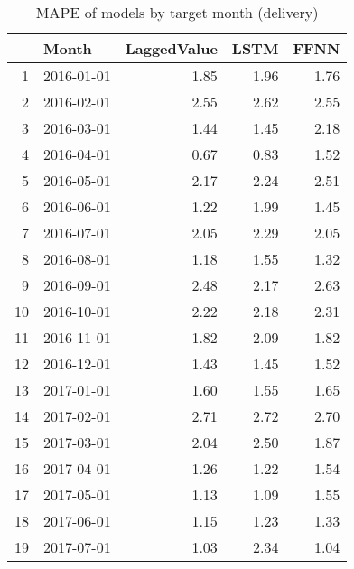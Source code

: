 \begin{table}[ht]
\centering
\begin{tabular}{rlrrr}
  \hline
 & Month & LaggedValue & LSTM & FFNN \\ 
  \hline
1 & 2016-01-01 & 1.85 & 1.96 & 1.76 \\ 
  2 & 2016-02-01 & 2.55 & 2.62 & 2.55 \\ 
  3 & 2016-03-01 & 1.44 & 1.45 & 2.18 \\ 
  4 & 2016-04-01 & 0.67 & 0.83 & 1.52 \\ 
  5 & 2016-05-01 & 2.17 & 2.24 & 2.51 \\ 
  6 & 2016-06-01 & 1.22 & 1.99 & 1.45 \\ 
  7 & 2016-07-01 & 2.05 & 2.29 & 2.05 \\ 
  8 & 2016-08-01 & 1.18 & 1.55 & 1.32 \\ 
  9 & 2016-09-01 & 2.48 & 2.17 & 2.63 \\ 
  10 & 2016-10-01 & 2.22 & 2.18 & 2.31 \\ 
  11 & 2016-11-01 & 1.82 & 2.09 & 1.82 \\ 
  12 & 2016-12-01 & 1.43 & 1.45 & 1.52 \\ 
  13 & 2017-01-01 & 1.60 & 1.55 & 1.65 \\ 
  14 & 2017-02-01 & 2.71 & 2.72 & 2.70 \\ 
  15 & 2017-03-01 & 2.04 & 2.50 & 1.87 \\ 
  16 & 2017-04-01 & 1.26 & 1.22 & 1.54 \\ 
  17 & 2017-05-01 & 1.13 & 1.09 & 1.55 \\ 
  18 & 2017-06-01 & 1.15 & 1.23 & 1.33 \\ 
  19 & 2017-07-01 & 1.03 & 2.34 & 1.04 \\ 
   \hline
\end{tabular}
\caption{MAPE of models by target month (delivery)} 
\label{tab:mape_monthly}
\end{table}
